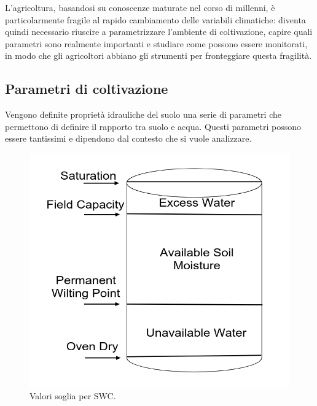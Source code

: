 \documentclass[12pt,a4paper,openright,twoside]{book}
\begin{document}
L'agricoltura, basandosi su conoscenze maturate nel corso di millenni, è particolarmente fragile al rapido cambiamento delle variabili climatiche\cite{Janani2024}: diventa quindi necessario riuscire a parametrizzare l'ambiente di coltivazione, capire quali parametri sono realmente importanti e studiare come possono essere monitorati, in modo che gli agricoltori abbiano gli strumenti per fronteggiare questa fragilità\cite{Monteleone2023}.

\subsection{Parametri di coltivazione}\label{parametri-coltivazione}

Vengono definite proprietà idrauliche del suolo una serie di parametri che permettono di definire il rapporto tra suolo e acqua. Questi parametri possono essere tantissimi e dipendono dal contesto che si vuole analizzare.
\begin{figure}
    \centering
    \includegraphics[width=0.5\linewidth]{../figures/SWC-costants.png}
    \caption{Valori soglia per \ac{SWC}\cite{Ding2022}.}
    \label{fig.SWC-costants}
\end{figure}
\end{document}
